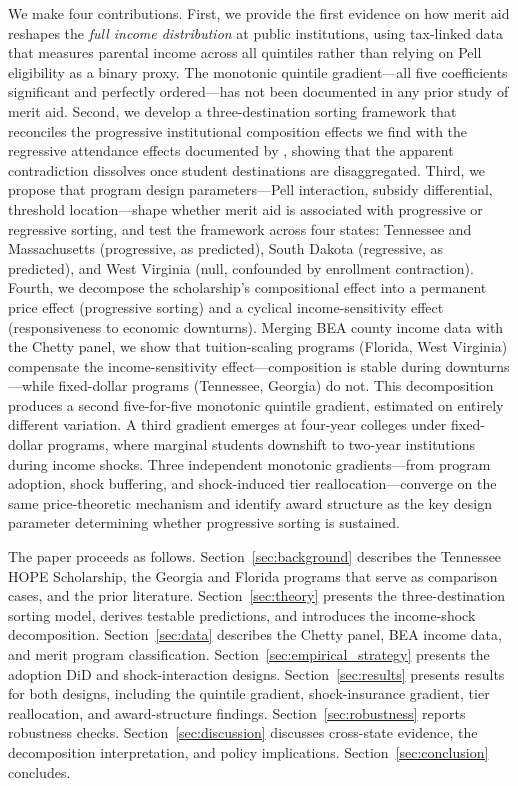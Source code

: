 We make four contributions. First, we provide the first
evidence on how merit aid reshapes the \emph{full income distribution}
at public institutions, using tax-linked data that measures parental
income across all quintiles rather than relying on Pell eligibility as a
binary proxy. The monotonic quintile gradient---all five coefficients
significant and perfectly ordered---has not been documented in any prior
study of merit aid. Second, we develop a three-destination sorting
framework that reconciles the progressive institutional composition
effects we find with the regressive attendance effects documented by
\textcite{dynarski2000hope}, showing that the apparent contradiction
dissolves once student destinations are disaggregated. Third, we
propose that program design parameters---Pell interaction, subsidy
differential, threshold location---shape whether merit aid is associated
with progressive or regressive sorting, and test the framework across
four states: Tennessee and Massachusetts (progressive, as predicted),
South Dakota (regressive, as predicted), and West Virginia (null,
confounded by enrollment contraction). Fourth, we decompose the
scholarship's compositional effect into a permanent price effect
(progressive sorting) and a cyclical income-sensitivity effect
(responsiveness to economic downturns). Merging BEA county income data
with the Chetty panel, we show that tuition-scaling programs (Florida,
West Virginia) compensate the income-sensitivity effect---composition
is stable during downturns---while fixed-dollar programs (Tennessee,
Georgia) do not. This decomposition produces a second five-for-five
monotonic quintile gradient, estimated on entirely different variation.
A third gradient emerges at four-year colleges under fixed-dollar
programs, where marginal students downshift to two-year institutions
during income shocks. Three independent monotonic gradients---from
program adoption, shock buffering, and shock-induced tier
reallocation---converge on the same price-theoretic mechanism and
identify award structure as the key design parameter determining
whether progressive sorting is sustained.

The paper proceeds as follows. Section~\ref{sec:background} describes
the Tennessee HOPE Scholarship, the Georgia and Florida programs that
serve as comparison cases, and the prior literature.
Section~\ref{sec:theory} presents the three-destination sorting model,
derives testable predictions, and introduces the income-shock
decomposition. Section~\ref{sec:data} describes the Chetty panel,
BEA income data, and merit program classification.
Section~\ref{sec:empirical_strategy} presents the adoption DiD and
shock-interaction designs. Section~\ref{sec:results} presents results
for both designs, including the quintile gradient, shock-insurance
gradient, tier reallocation, and award-structure findings.
Section~\ref{sec:robustness} reports robustness checks.
Section~\ref{sec:discussion} discusses cross-state evidence, the
decomposition interpretation, and policy implications.
Section~\ref{sec:conclusion} concludes.
